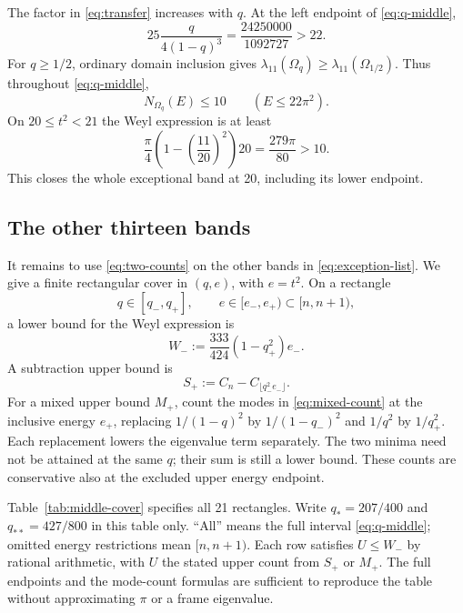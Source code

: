 \documentclass[11pt,reqno]{amsart}
\numberwithin{equation}{section}
\newcommand{\Om}{\Omega}
\begin{document}
The factor in \eqref{eq:transfer} increases with $q$. At the
left endpoint of \eqref{eq:q-middle},
\[
 25\frac{q}{4(1-q)^3}=\frac{24250000}{1092727}>22.
\]
For $q\ge1/2$, ordinary domain inclusion gives
$\lambda_{11}(\Om_q)\ge\lambda_{11}(\Om_{1/2})$.
Thus throughout \eqref{eq:q-middle},
\begin{equation}\label{eq:actual-gap}
 N_{\Om_q}(E)\le10\qquad(E\le22\pi^2).
\end{equation}
On $20\le t^2<21$ the Weyl expression is at least
\[
 \frac\pi4\left(1-\left(\frac{11}{20}\right)^2\right)20
 =\frac{279\pi}{80}>10.
\]
This closes the whole exceptional band at 20, including its
lower endpoint.

\subsection*{The other thirteen bands}

It remains to use \eqref{eq:two-counts} on the other bands
in \eqref{eq:exception-list}. We give a finite rectangular
cover in $(q,e)$, with $e=t^2$. On a rectangle
\[
 q\in[q_-,q_+],\qquad e\in[e_-,e_+)\subset[n,n+1),
\]
a lower bound for the Weyl expression is
\begin{equation}\label{eq:box-weyl}
 W_-:=\frac{333}{424}(1-q_+^2)e_-.
\end{equation}
A subtraction upper bound is
\begin{equation}\label{eq:box-subtraction}
 S_+:=C_n-C_{\lfloor q_-^2e_-\rfloor}.
\end{equation}
For a mixed upper bound $M_+$, count the modes in
\eqref{eq:mixed-count} at the inclusive energy $e_+$,
replacing $1/(1-q)^2$ by $1/(1-q_-)^2$ and $1/q^2$
by $1/q_+^2$. Each replacement lowers the eigenvalue
term separately. The two minima need not be attained at
the same $q$; their sum is still a lower bound. These
counts are conservative also at the excluded upper
energy endpoint.

Table~\ref{tab:middle-cover} specifies all 21 rectangles.
Write $q_*=207/400$ and $q_{**}=427/800$ in this table only.
``All'' means the full interval \eqref{eq:q-middle}; omitted
energy restrictions mean $[n,n+1)$. Each row satisfies
$U\le W_-$ by rational arithmetic, with $U$ the stated
upper count from $S_+$ or $M_+$. The full endpoints and the
mode-count formulas are sufficient to reproduce the table
without approximating $\pi$ or a frame eigenvalue.
\end{document}
